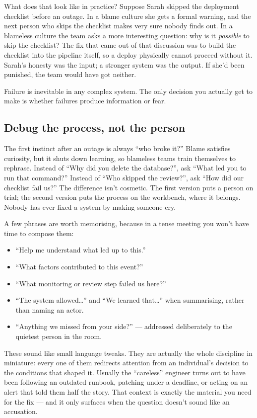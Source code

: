 What does that look like in practice? Suppose Sarah skipped the deployment checklist before an outage. In a blame culture she gets a formal warning, and the next person who skips the checklist makes very sure nobody finds out. In a blameless culture the team asks a more interesting question: why is it \emph{possible} to skip the checklist? The fix that came out of that discussion was to build the checklist into the pipeline itself, so a deploy physically cannot proceed without it. Sarah's honesty was the input; a stronger system was the output. If she'd been punished, the team would have got neither.


Failure is inevitable in any complex system. The only decision you actually get to make is whether failures produce information or fear.



\subsection{Debug the process, not the person}


The first instinct after an outage is always ``who broke it?'' Blame satisfies curiosity, but it shuts down learning, so blameless teams train themselves to rephrase. Instead of ``Why did you delete the database?'', ask ``What led you to run that command?'' Instead of ``Who skipped the review?'', ask ``How did our checklist fail us?'' The difference isn't cosmetic. The first version puts a person on trial; the second version puts the process on the workbench, where it belongs. Nobody has ever fixed a system by making someone cry.


A few phrases are worth memorising, because in a tense meeting you won't have time to compose them:


\begin{itemize}[leftmargin=*]
\item ``Help me understand what led up to this.''
\item ``What factors contributed to this event?''
\item ``What monitoring or review step failed us here?''
\item ``The system allowed…'' and ``We learned that…'' when summarising, rather than naming an actor.
\item ``Anything we missed from your side?'' — addressed deliberately to the quietest person in the room.
\end{itemize}

These sound like small language tweaks. They are actually the whole discipline in miniature: every one of them redirects attention from an individual's decision to the conditions that shaped it. Usually the ``careless'' engineer turns out to have been following an outdated runbook, patching under a deadline, or acting on an alert that told them half the story. That context is exactly the material you need for the fix — and it only surfaces when the question doesn't sound like an accusation.



